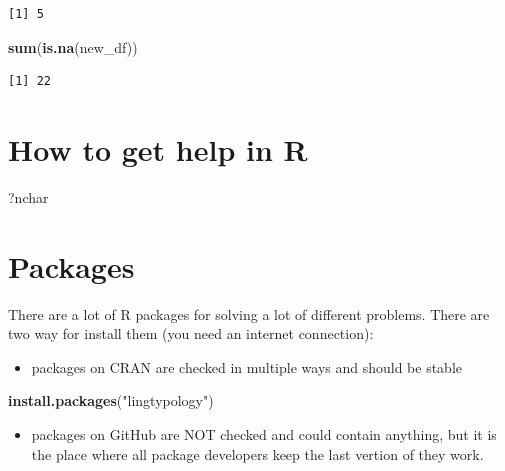 \documentclass[]{book}
\newenvironment{Shaded}{\begin{snugshade}}{\end{snugshade}}
\newcommand{\KeywordTok}[1]{\textcolor[rgb]{0.13,0.29,0.53}{\textbf{#1}}}
\newcommand{\StringTok}[1]{\textcolor[rgb]{0.31,0.60,0.02}{#1}}
\newcommand{\NormalTok}[1]{#1}
\providecommand{\tightlist}{%
  \setlength{\itemsep}{0pt}\setlength{\parskip}{0pt}}
\theoremstyle{definition}
\theoremstyle{definition}
\theoremstyle{definition}
\theoremstyle{remark}
\begin{document}
\begin{verbatim}
[1] 5
\end{verbatim}

\begin{Shaded}
\begin{Highlighting}[]
\KeywordTok{sum}\NormalTok{(}\KeywordTok{is.na}\NormalTok{(new_df))}
\end{Highlighting}
\end{Shaded}

\begin{verbatim}
[1] 22
\end{verbatim}

\section{How to get help in R}\label{how-to-get-help-in-r}

\begin{Shaded}
\begin{Highlighting}[]
\NormalTok{?nchar}
\end{Highlighting}
\end{Shaded}

\section{Packages}\label{packages}

There are a lot of R packages for solving a lot of different problems.
There are two way for install them (you need an internet connection):

\begin{itemize}
\tightlist
\item
  packages on CRAN are checked in multiple ways and should be stable
\end{itemize}

\begin{Shaded}
\begin{Highlighting}[]
\KeywordTok{install.packages}\NormalTok{(}\StringTok{"lingtypology"}\NormalTok{)}
\end{Highlighting}
\end{Shaded}

\begin{itemize}
\tightlist
\item
  packages on GitHub are NOT checked and could contain anything, but it
  is the place where all package developers keep the last vertion of
  they work.
\end{itemize}
\end{document}
